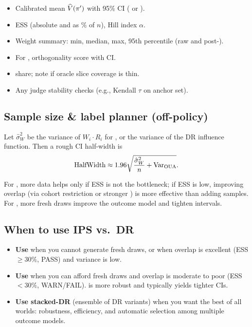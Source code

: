 \begin{itemize}
\item Calibrated mean $\widehat{V}(\pi')$ with 95\% CI (\ips{} or \dr).
\item ESS (absolute and as \% of $n$), Hill index $\alpha$.
\item Weight summary: min, median, max, 95th percentile (raw and post-\simcal).
\item For \dr, orthogonality score with CI.
\item \oua{} share; note if oracle slice coverage is thin.
\item Any judge stability checks (e.g., Kendall $\tau$ on anchor set).
\end{itemize}

\subsection{Sample size \& label planner (off-policy)}

Let $\hat{\sigma}_W^2$ be the variance of $W_i \cdot R_i$ for \ips, or the variance of the DR influence function. Then a rough CI half-width is
\begin{equation}
\text{HalfWidth} \approx 1.96 \sqrt{\frac{\hat{\sigma}_W^2}{n} + \operatorname{Var}_{\text{OUA}}}.
\end{equation}

For \ips, more data helps only if ESS is not the bottleneck; if ESS is low, improving overlap (via cohort restriction or stronger \simcal) is more effective than adding samples. For \dr, more fresh draws improve the outcome model and tighten intervals.

\subsection{When to use IPS vs.\ DR}

\begin{itemize}
\item \textbf{Use \ips{}} when you cannot generate fresh draws, or when overlap is excellent (ESS $\ge 30\%$, PASS) and variance is low.
\item \textbf{Use \dr{}} when you can afford fresh draws and overlap is moderate to poor (ESS $< 30\%$, WARN/FAIL). \dr{} is more robust and typically yields tighter CIs.
\item \textbf{Use stacked-DR} (ensemble of DR variants) when you want the best of all worlds: robustness, efficiency, and automatic selection among multiple outcome models.
\end{itemize}

